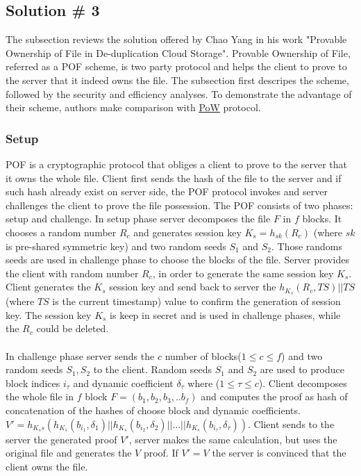 \documentclass[12pt]{article}
\begin{document}
\subsection{Solution \# 3}
\label{sub:Soltuion3}
The subsection reviews the solution offered by Chao Yang in his work "Provable Ownership of File in De-duplication Cloud Storage".\cite{POF} Provable Ownership of File, referred as a POF scheme, is two party protocol and helps the client to prove to the server that it indeed owns the file. The subsection first descripes the scheme, followed by the security and efficiency analyses. To demonstrate the  advantage of their scheme,  authors make comparison with \hyperref[sub:Soltuion1]{PoW} protocol.

\subsubsection{Setup}
\label{subsub:setup3}

POF is a cryptographic protocol that obliges a client to prove to the server that it owns the whole file. Client first sends the hash of the file to the server and if such hash already exist on server side, the POF protocol invokes and server challenges the client to prove the file possession. The POF consists of two phases: setup and challenge. In setup phase server decomposes the file $F$ in $f$ blocks. It chooses a random number  $R_c$  and generates session key $K_s = h_{sk}(R_c)$ (where $sk$ is pre-shared symmetric key) and two random seeds $S_1$ and $S_2$. Those randoms seeds are used in challenge phase to choose the blocks of the  file. Server provides the client with random number $R_c$, in order to generate the same session key $K_s$. Client generates the $K_s$ session key and  send back to server the $h_{K_s}(R_c, TS)||TS$ (where $TS$ is the current timestamp) value to confirm the generation of session key.  The session key $K_s$ is keep in secret and is used in challenge phases, while the $R_c$ could be deleted.\\\\
In challenge phase server sends the $c$ number of blocks($1 \leqslant c \leqslant f $) and two random seeds $S_1,S_2$ to the client. Random seeds $S_1$ and $S_2$ are used to produce block indices $i_\tau$ and dynamic coefficient $\delta_\tau$  where ($1 \leqslant \tau \leqslant c$). Client decomposes the whole  file in $f$ block $F=(b_1,b_2,b_3,..b_f)$ and computes the proof as hash of concatenation of the hashes of choose block and dynamic coefficients.  $V' = h_{K_ss}(h_{K_s}(b_{i_1},\delta_1)||h_{K_s}(b_{i_2},\delta_2)|| ...||h_{K_s}(b_{i_\tau},\delta_\tau))$. Client sends to the server the generated proof $V'$, server makes the same calculation, but uses the original file and generates the $V$ proof. If $V'=V$ the server is convinced that the client  owns the file. 
 
\end{document}
